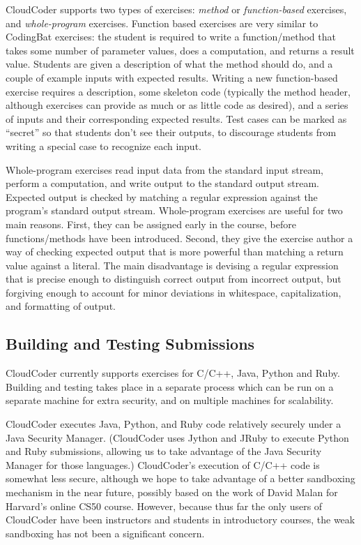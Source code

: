 \documentclass{sig-alternate}
\begin{document}
CloudCoder supports two types of exercises:  {\em method} or {\em function-based}
exercises, and {\em whole-program} exercises.  Function based exercises are
very similar to CodingBat exercises: the student is required to write
a function/method that takes some number of parameter values,
does a computation, and returns a result value.
Students are given a description of
what the method should do, and a couple of example inputs with
expected results.  Writing a new function-based exercise
requires a description, some skeleton code (typically the method
header, although exercises can provide as much or as little code as
desired), and a series of inputs and their corresponding expected results.
Test cases can be marked as ``secret'' so that students don't see their
outputs, to discourage students from writing a special case to
recognize each input.

Whole-program exercises read input data from
the standard input stream, perform a computation, and write output to the standard output stream.
Expected output is checked by matching a regular expression against the
program's standard output stream.
Whole-program exercises are useful for two main reasons.  First,
they can be assigned early in the course, before functions/methods
have been introduced.  Second, they give the exercise author a
way of checking expected output that is more powerful than matching a return
value against a literal.  The main disadvantage is devising a
regular expression that is precise enough to distinguish correct output
from incorrect output, but forgiving enough to account for minor deviations
in whitespace, capitalization, and formatting of output.

\subsection{Building and Testing Submissions}

CloudCoder currently supports exercises for C/C++, Java, Python and
Ruby.  Building and testing takes place in a separate process which
can be run on a separate machine for extra security, and on multiple
machines for scalability.

CloudCoder executes Java, Python, and Ruby code relatively securely under
a Java Security Manager.
(CloudCoder uses Jython\cite{jython} and JRuby\cite{jruby}
to execute Python and Ruby submissions, allowing us to take advantage of
the Java Security Manager for those languages.)
CloudCoder's execution of C/C++ code is somewhat less secure, although 
we hope to take advantage of a better sandboxing mechanism
in the near future, possibly based on the work of
David Malan\cite{Malan:2013:CSS:2445196.2445242} for Harvard's
online CS50 course.  However, because thus far the only users of
CloudCoder have been instructors and students in introductory courses,
the weak sandboxing has not been a significant concern.
\end{document}
